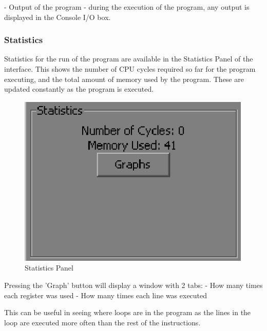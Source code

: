 - Output of the program - during the execution of the program, any output is displayed in the Console I/O box.

\subsubsection{Statistics}
Statistics for the run of the program are available in the Statistics Panel of the interface.  This shows the number of CPU cycles required so far for the program executing, and the total amount of memory used by the program.  These are updated constantly as the program is executed.

\begin{figure}[h]
\centering
\includegraphics[scale=0.5]{Ch4-Fig6.eps}
\caption{Statistics Panel}
\label{figure.Statistics Panel}
\end{figure}


Pressing the 'Graph' button will display a window with 2 tabs:
- How many times each register was used
- How many times each line was executed

This can be useful in seeing where loops are in the program as the lines in the loop are executed more often than the rest of the instructions.

